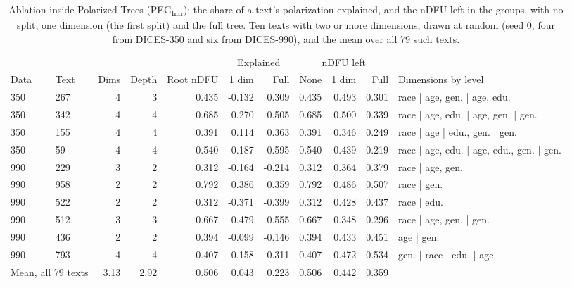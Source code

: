 \begin{table}[t]
\centering
\small
\caption{Ablation inside Polarized Trees (PEG\textsubscript{har}): the share of a text's polarization explained, and the nDFU left in the groups, with no split, one dimension (the first split) and the full tree. Ten texts with two or more dimensions, drawn at random (seed 0, four from DICES-350 and six from DICES-990), and the mean over all 79 such texts.}
\label{tab:dims-ablation}
\begin{tabular}{llrrrrrrrrl}
\toprule
 & & & & & \multicolumn{2}{c}{Explained} & \multicolumn{3}{c}{nDFU left} & \\
\cmidrule(lr){6-7}\cmidrule(lr){8-10}
Data & Text & Dims & Depth & Root nDFU & 1 dim & Full & None & 1 dim & Full & Dimensions by level \\
\midrule
350 & 267 & 4 & 3 & 0.435 & -0.132 & 0.309 & 0.435 & 0.493 & 0.301 & race | age, gen. | age, edu. \\
350 & 342 & 4 & 4 & 0.685 & 0.270 & 0.505 & 0.685 & 0.500 & 0.339 & race | age, edu. | age, gen. | gen. \\
350 & 155 & 4 & 4 & 0.391 & 0.114 & 0.363 & 0.391 & 0.346 & 0.249 & race | age | edu., gen. | gen. \\
350 & 59 & 4 & 4 & 0.540 & 0.187 & 0.595 & 0.540 & 0.439 & 0.219 & race | age, edu. | age, edu., gen. | gen. \\
990 & 229 & 3 & 2 & 0.312 & -0.164 & -0.214 & 0.312 & 0.364 & 0.379 & race | age, gen. \\
990 & 958 & 2 & 2 & 0.792 & 0.386 & 0.359 & 0.792 & 0.486 & 0.507 & race | gen. \\
990 & 522 & 2 & 2 & 0.312 & -0.371 & -0.399 & 0.312 & 0.428 & 0.437 & race | edu. \\
990 & 512 & 3 & 3 & 0.667 & 0.479 & 0.555 & 0.667 & 0.348 & 0.296 & race | age, gen. | gen. \\
990 & 436 & 2 & 2 & 0.394 & -0.099 & -0.146 & 0.394 & 0.433 & 0.451 & age | gen. \\
990 & 793 & 4 & 4 & 0.407 & -0.158 & -0.311 & 0.407 & 0.472 & 0.534 & gen. | race | edu. | age \\
\midrule
\multicolumn{2}{l}{Mean, all 79 texts} & 3.13 & 2.92 & 0.506 & 0.043 & 0.223 & 0.506 & 0.442 & 0.359 &  \\
\bottomrule
\end{tabular}
\end{table}

